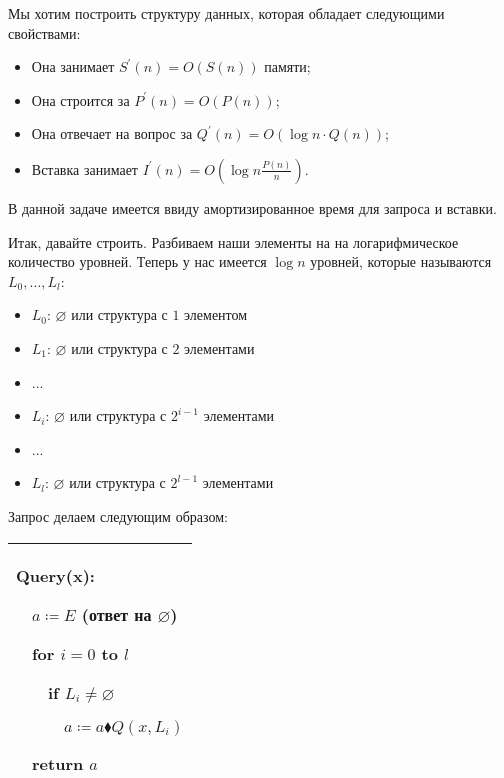 \begin{task}
	Мы хотим построить структуру данных, которая обладает следующими свойствами:

	\begin{itemize}
		\item Она занимает $S^\prime(n) = O(S(n))$ памяти;

		\item Она строится за $P^\prime(n) = O(P(n))$;

		\item Она отвечает на вопрос за $Q^\prime(n) = O(\log n\cdot Q(n))$;

		\item Вставка занимает $I^\prime(n) = O\left(\log n\frac{P(n)}{n}\right)$.


	\end{itemize}

	В данной задаче имеется ввиду амортизированное время для запроса и вставки.
\end{task}

Итак, давайте строить. Разбиваем наши элементы на на логарифмическое количество уровней. Теперь у нас имеется $\log n $ уровней, которые называются $L_0,\ldots,L_l$:
\begin{itemize}
	\item $L_0$: $\varnothing$ или структура с $1$ элементом

	\item $L_1$: $\varnothing$ или структура с $2$ элементами

	\item ...

	\item $L_i$: $\varnothing$ или структура с $2^{i-1}$ элементами

	\item ...

	\item $L_l$: $\varnothing$ или структура с $2^{l-1}$ элементами
\end{itemize}

Запрос делаем следующим образом:


\begin{tabular}{|p{4cm}|}
	\hline
	Query(x):

	$\quad$$a \coloneqq E$ (ответ на $\varnothing$)

		$\quad$for $i = 0$ to $l$

	$\quad$$\quad$if $L_i \ne \varnothing$

	$\quad$$\quad$$\quad$$a \coloneqq a\blacklozenge Q(x,L_i)$

	$\quad$return $a$ \\
	\hline
\end{tabular}


